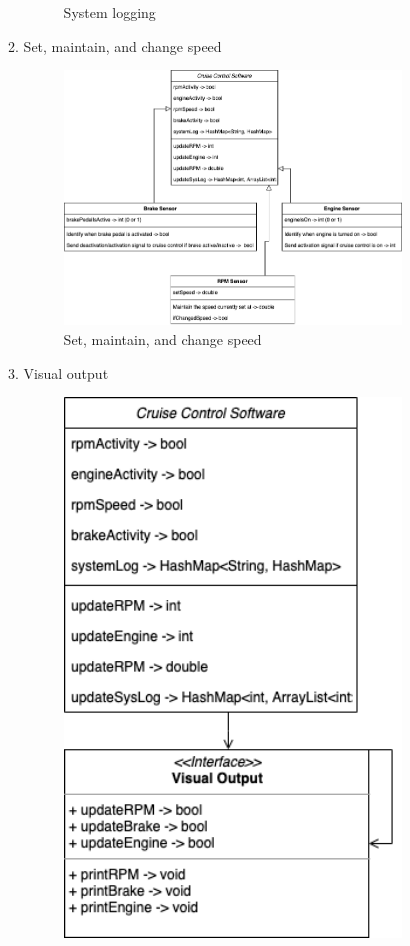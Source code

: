 \documentclass[preprint,11pt,3p]{article}
\begin{document}
\begin{enumerate}
\begin{enumerate}
\begin{figure}[H]
					\caption{System logging}
					\label{fig:logging}
				\end{figure}
			\item Set, maintain, and change speed
				\begin{figure}[H]
					\includegraphics[width=0.9\textwidth]{images/classMapCS347_set.png}
					\caption{Set, maintain, and change speed}
					\label{fig:set}
				\end{figure}
			\item Visual output
				\begin{figure}[H]
					\includegraphics[width=0.9\textwidth]{images/classMapCS347_visual_output.png}

\end{figure}
\end{enumerate}
\end{enumerate}
\end{document}
